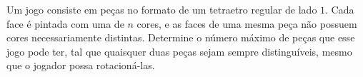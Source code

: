 Um jogo consiste em peças no formato de um tetraetro regular de lado $1$. Cada face é pintada com uma de $n$ cores, e as faces de uma mesma peça não possuem cores necessariamente distintas. Determine o número máximo de peças que esse jogo pode ter, tal que quaisquer duas peças sejam sempre distinguíveis, mesmo que o jogador possa rotacioná-las.
